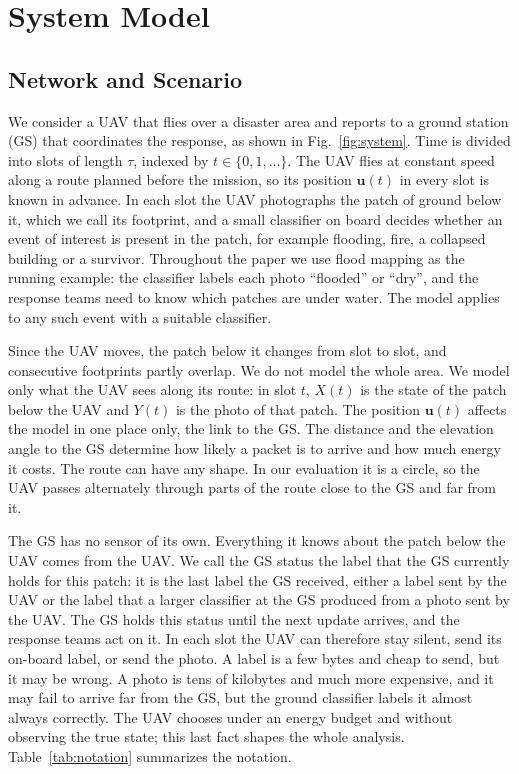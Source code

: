 \documentclass[journal]{IEEEtran}
\theoremstyle{remark}
\begin{document}
\section{System Model}\label{sec:model}
\subsection{Network and Scenario}\label{sec:story}
We consider a UAV that flies over a disaster area and reports to a ground station (GS) that coordinates the response, as shown in Fig.~\ref{fig:system}. Time is divided into slots of length $\tau$, indexed by $t\in\{0,1,\dots\}$. The UAV flies at constant speed along a route planned before the mission, so its position $\mathbf{u}(t)$ in every slot is known in advance. In each slot the UAV photographs the patch of ground below it, which we call its footprint, and a small classifier on board decides whether an event of interest is present in the patch, for example flooding, fire, a collapsed building or a survivor. Throughout the paper we use flood mapping as the running example: the classifier labels each photo ``flooded'' or ``dry'', and the response teams need to know which patches are under water. The model applies to any such event with a suitable classifier.

Since the UAV moves, the patch below it changes from slot to slot, and consecutive footprints partly overlap. We do not model the whole area. We model only what the UAV sees along its route: in slot $t$, $X(t)$ is the state of the patch below the UAV and $Y(t)$ is the photo of that patch. The position $\mathbf{u}(t)$ affects the model in one place only, the link to the GS. The distance and the elevation angle to the GS determine how likely a packet is to arrive and how much energy it costs. The route can have any shape. In our evaluation it is a circle, so the UAV passes alternately through parts of the route close to the GS and far from it.

The GS has no sensor of its own. Everything it knows about the patch below the UAV comes from the UAV. We call the GS status the label that the GS currently holds for this patch: it is the last label the GS received, either a label sent by the UAV or the label that a larger classifier at the GS produced from a photo sent by the UAV. The GS holds this status until the next update arrives, and the response teams act on it. In each slot the UAV can therefore stay silent, send its on-board label, or send the photo. A label is a few bytes and cheap to send, but it may be wrong. A photo is tens of kilobytes and much more expensive, and it may fail to arrive far from the GS, but the ground classifier labels it almost always correctly. The UAV chooses under an energy budget and without observing the true state; this last fact shapes the whole analysis. Table~\ref{tab:notation} summarizes the notation.
\end{document}
